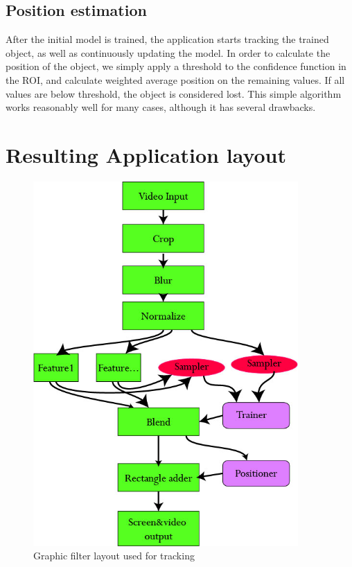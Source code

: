 \subsection{Position estimation}
After the initial model is trained, the application starts tracking the trained object, as well as continuously updating the model. In order to calculate the position of the object, we simply apply a threshold to the confidence function in the ROI, and calculate weighted average position on the remaining values. If all values are below threshold, the object is considered lost. This simple algorithm works reasonably well for many cases, although it has several drawbacks.
\section{Resulting Application layout}
\begin{figure}[t]
		\centering
		\includegraphics[width=0.9\textwidth]{tracking}
		\caption{Graphic filter layout used for tracking}
		\label{tracking}
	\end{figure}
